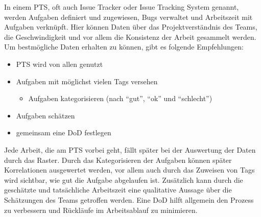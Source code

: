 In einem \acf{PTS}, oft auch Issue Tracker oder Issue Tracking System genannt, werden Aufgaben definiert und zugewiesen, Bugs verwaltet und Arbeitszeit mit Aufgaben verknüpft.
Hier können Daten über das Projektverständnis des Teams, die Geschwindigkeit und vor allem die Konsistenz der Arbeit gesammelt werden.
Um bestmögliche Daten erhalten zu können, gibt es folgende Empfehlungen:
\begin{itemize}[noitemsep]
  \item \ac{PTS} wird von allen genutzt
  \item Aufgaben mit möglichst vielen Tags versehen
  \begin{itemize}
    \item Aufgaben kategorisieren (nach ``gut'', ``ok'' und ``schlecht'')
  \end{itemize}
  \item Aufgaben schätzen
  \item gemeinsam eine \ac{DoD} festlegen
\end{itemize}
Jede Arbeit, die am \ac{PTS} vorbei geht, fällt später bei der Auswertung der Daten durch das Raster.
Durch das Kategorisieren der Aufgaben können später Korrelationen ausgewertet werden, vor allem auch durch das Zuweisen von Tags wird sichtbar, wie gut die Aufgabe abgelaufen ist.
Zusätzlich kann durch die geschätzte und tatsächliche Arbeitszeit eine qualitative Aussage über die Schätzungen des Teams getroffen werden.
Eine \ac{DoD} hilft allgemein den Prozess zu verbessern und Rückläufe im Arbeitsablauf zu minimieren.

